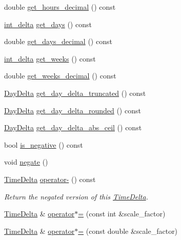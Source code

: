 \begin{DoxyCompactItemize}
\item 
double \hyperlink{structTimeDelta_af64fa27b7580167e18cd30ab1bec06ac}{get\-\_\-hours\-\_\-decimal} () const 
\item 
\hyperlink{types_8h_a8a67cf99971c5cfeeaa2380ba84a4c92}{int\-\_\-delta} \hyperlink{structTimeDelta_a0ce6b1715ab92fa1e66e14e952a64268}{get\-\_\-days} () const 
\item 
double \hyperlink{structTimeDelta_a76f968368aff4b45c80b0b147c417fd3}{get\-\_\-days\-\_\-decimal} () const 
\item 
\hyperlink{types_8h_a8a67cf99971c5cfeeaa2380ba84a4c92}{int\-\_\-delta} \hyperlink{structTimeDelta_aab4f773272785b9421b101ee243c0eaf}{get\-\_\-weeks} () const 
\item 
double \hyperlink{structTimeDelta_a927aad8d85f646d3712ded9c09ae957a}{get\-\_\-weeks\-\_\-decimal} () const 
\item 
\hyperlink{structDayDelta}{\-Day\-Delta} \hyperlink{structTimeDelta_a159836075fddd7cef439a08b206f0e97}{get\-\_\-day\-\_\-delta\-\_\-truncated} () const 
\item 
\hyperlink{structDayDelta}{\-Day\-Delta} \hyperlink{structTimeDelta_a188dd345b8e7eeceff4320103c727d15}{get\-\_\-day\-\_\-delta\-\_\-rounded} () const 
\item 
\hyperlink{structDayDelta}{\-Day\-Delta} \hyperlink{structTimeDelta_a50d3fe29ff74cd653c6b063c0ba05528}{get\-\_\-day\-\_\-delta\-\_\-abs\-\_\-ceil} () const 
\item 
bool \hyperlink{structTimeDelta_acc2faf0e9a1563c84fb68cad42521c54}{is\-\_\-negative} () const 
\item 
void \hyperlink{structTimeDelta_a858c8d0eae6070a24ba7fd3e18a3cf3f}{negate} ()
\item 
\hyperlink{structTimeDelta}{\-Time\-Delta} \hyperlink{structTimeDelta_a660df6f5ba7291bef24d5a05639563b6}{operator-\/} () const 
\begin{DoxyCompactList}\small\item\em \-Return the negated version of this \hyperlink{structTimeDelta}{\-Time\-Delta}. \end{DoxyCompactList}\item 
\hyperlink{structTimeDelta}{\-Time\-Delta} \& \hyperlink{structTimeDelta_aa1417029a51a1e2e7cf20445ad6cfa01}{operator$\ast$=} (const int \&scale\-\_\-factor)
\item 
\hyperlink{structTimeDelta}{\-Time\-Delta} \& \hyperlink{structTimeDelta_a8301b98264ca9539a160a756e4014559}{operator$\ast$=} (const double \&scale\-\_\-factor)
\item 

\end{DoxyCompactItemize}
